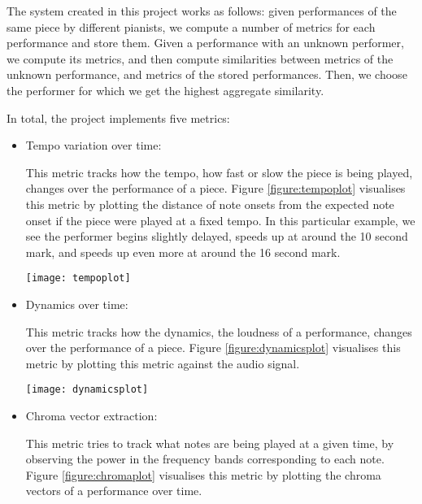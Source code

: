 \documentclass[oneside, class=book, crop=false, 12pt]{standalone}
\begin{document}
The system created in this project works as follows: given performances of the same piece by different pianists, we compute a number of metrics for each performance and store them. Given a performance with an unknown performer, we compute its metrics, and then compute similarities between metrics of the unknown performance, and metrics of the stored performances. Then, we choose the performer for which we get the highest aggregate similarity.

In total, the project implements five metrics:

\begin{itemize}
  \item
    Tempo variation over time:

    This metric tracks how the tempo, how fast or slow the piece is being played, changes over the performance of a piece. Figure \ref{figure:tempoplot} visualises this metric by plotting the distance of note onsets from the expected note onset if the piece were played at a fixed tempo. In this particular example, we see the performer begins slightly delayed, speeds up at around the 10 second mark, and speeds up even more at around the 16 second mark.

\begin{minipage}{\textwidth}
  \centering
  \texttt{[image: tempoplot]}
  \label{figure:tempoplot}
\end{minipage}

  \item
    Dynamics over time:

    This metric tracks how the dynamics, the loudness of a performance, changes over the performance of a piece. Figure \ref{figure:dynamicsplot} visualises this metric by plotting this metric against the audio signal.

\begin{minipage}{\textwidth}
  \centering
  \texttt{[image: dynamicsplot]}
  \label{figure:dynamicsplot}
\end{minipage}


  \item
    Chroma vector extraction:

    This metric tries to track what notes are being played at a given time, by observing the power in the frequency bands corresponding to each note. Figure \ref{figure:chromaplot} visualises this metric by plotting the chroma vectors of a performance over time.


\end{itemize}
\end{document}
